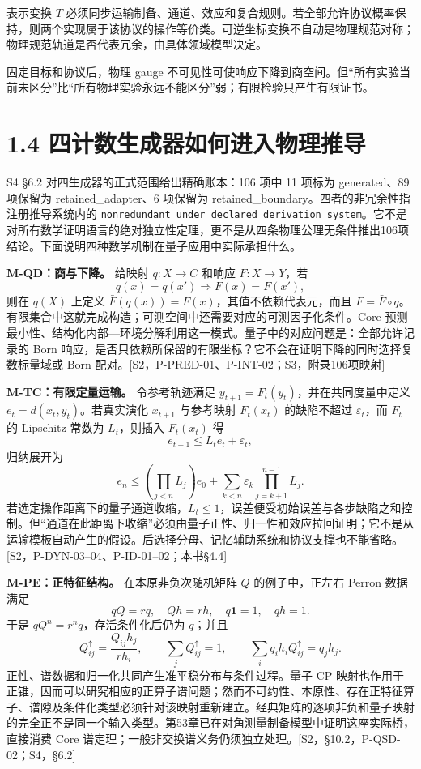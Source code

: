 \documentclass[
  11pt,
  oneside]{book}
\begin{document}
表示变换 \(T\)
必须同步运输制备、通道、效应和复合规则。若全部允许协议概率保持，则两个实现属于该协议的操作等价类。可逆坐标变换不自动是物理规范对称；物理规范轨道是否代表冗余，由具体领域模型决定。

固定目标和协议后，物理 gauge
不可见性可使响应下降到商空间。但``所有实验当前未区分''比``所有物理实验永远不能区分''弱；有限检验只产生有限证书。

\section{1.4 四计数生成器如何进入物理推导}

S4 §6.2 对四生成器的正式范围给出精确账本：106 项中 11 项标为
generated、89 项保留为 retained\_\allowbreak adapter、6 项保留为
retained\_\allowbreak boundary。四者的非冗余性指注册推导系统内的
\texttt{nonredundant\_\allowbreak under\_\allowbreak declared\_\allowbreak derivation\_\allowbreak system}。它不是对所有数学证明语言的绝对独立性定理，更不是从四条物理公理无条件推出106项结论。下面说明四种数学机制在量子应用中实际承担什么。

\textbf{M-QD：商与下降。} 给映射 \(q:X\to C\) 和响应 \(F:X\to Y\)，若 \[
q(x)=q(x')\Longrightarrow F(x)=F(x'),
\] 则在 \(q(X)\) 上定义 \(\bar F(q(x))=F(x)\)，其值不依赖代表元，而且
\(F=\bar F\circ q\)。有限集合中这就完成构造；可测空间中还需要对应的可测因子化条件。Core
预测最小性、结构化内部---环境分解利用这一模式。量子中的对应问题是：全部允许记录的
Born
响应，是否只依赖所保留的有限坐标？它不会在证明下降的同时选择复数标量域或
Born 配对。{[}S2，P-PRED-01、P-INT-02；S3，附录106项映射{]}

\textbf{M-TC：有限定量运输。} 令参考轨迹满足
\(y_{t+1}=F_t(y_t)\)，并在共同度量中定义 \(e_t=d(x_t,y_t)\)。若真实演化
\(x_{t+1}\) 与参考映射 \(F_t(x_t)\) 的缺陷不超过 \(\varepsilon_t\)，而
\(F_t\) 的 Lipschitz 常数为 \(L_t\)，则插入 \(F_t(x_t)\) 得 \[
e_{t+1}\le L_te_t+\varepsilon_t,
\] 归纳展开为 \[
e_n\le\left(\prod_{j<n}L_j\right)e_0+
\sum_{k<n}\varepsilon_k\prod_{j=k+1}^{n-1}L_j.
\]
若选定操作距离下的量子通道收缩，\(L_t\le1\)，误差便受初始误差与各步缺陷之和控制。但``通道在此距离下收缩''必须由量子正性、归一性和效应拉回证明；它不是从运输模板自动产生的假设。后选择分母、记忆辅助系统和协议支撑也不能省略。{[}S2，P-DYN-03--04、P-ID-01--02；本书§4.4{]}

\textbf{M-PE：正特征结构。} 在本原非负次随机矩阵 \(Q\) 的例子中，正左右
Perron 数据满足 \[
qQ=rq,\quad Qh=rh,\quad q\mathbf1=1,\quad qh=1.
\] 于是 \(qQ^n=r^nq\)，存活条件化后仍为 \(q\)；并且 \[
Q^\uparrow_{ij}=\frac{Q_{ij}h_j}{rh_i},\qquad
\sum_jQ^\uparrow_{ij}=1,\qquad
\sum_iq_i h_iQ^\uparrow_{ij}=q_jh_j.
\] 正性、谱数据和归一化共同产生准平稳分布与条件过程。量子 CP
映射也作用于正锥，因而可以研究相应的正算子谱问题；然而不可约性、本原性、存在正特征算子、谱隙及条件化类型必须针对该映射重新建立。经典矩阵的逐项非负和量子映射的完全正不是同一个输入类型。第53章已在对角测量制备模型中证明这座实际桥，直接消费
Core
谱定理；一般非交换谱义务仍须独立处理。{[}S2，§10.2，P-QSD-02；S4，§6.2{]}
\end{document}
